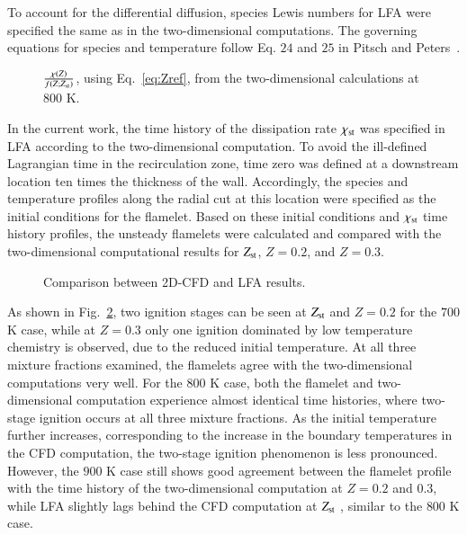 \documentclass[review,3p,times]{elsarticle}
\begin{document}
To account for the differential diffusion, species Lewis numbers for LFA  were specified the same as in the two-dimensional computations.  The governing equations for species and temperature follow Eq. $24$ and $25$ in Pitsch and Peters~\cite{pitsch98b}.

\begin{figure}
  \centering
  \scriptsize
  
  \normalsize
  \caption{$\frac{\chi(Z)}{f(Z;Z_{\rm st})}$, using Eq.~\ref{eq:Zref}, from the two-dimensional calculations at $800$ K.}
  \label{fig:Zref}
\end{figure}

In the current work, the time history of the dissipation rate $\chi_{\rm st}$ was specified in LFA according to the two-dimensional computation.  To avoid the ill-defined Lagrangian time in the recirculation zone, time zero was defined at a downstream location ten times the thickness of the wall.  Accordingly, the species and temperature profiles along the radial cut at this location were specified as the initial conditions for the flamelet.  Based on these initial conditions and $\chi_{\rm st}$ time history profiles, the unsteady flamelets were calculated and compared with the two-dimensional computational results for $Z_{\rm st}$, $Z = 0.2$, and $Z = 0.3$.       

\begin{figure}
  \centering
  \scriptsize
  
  \normalsize
  \caption{Comparison between 2D-CFD and LFA results.}
  \label{fig:LFA}
\end{figure}

As shown in Fig.~\ref{fig:LFA}, two ignition stages can be seen at $Z_{\rm st}$ and $Z = 0.2$ for the $700$ K case, while at $Z = 0.3$ only one ignition dominated by low temperature chemistry is observed, due to the reduced initial temperature.   \textcolor{mycolor}{At all three mixture fractions examined, the flamelets agree with the two-dimensional computations very well.}  For the $800$ K case, both the flamelet and two-dimensional computation experience almost identical time histories, where two-stage ignition occurs at all three mixture fractions.  As the initial temperature further increases, corresponding to the increase in the boundary temperatures in the CFD computation, the two-stage ignition phenomenon is less pronounced.  However, the $900$ K case still shows good agreement between the flamelet profile with the time history of the two-dimensional computation \textcolor{mycolor}{at $Z = 0.2$ and $0.3$, while LFA slightly lags behind the CFD computation at $Z_{\rm st}$ , similar to the $800$ K case.}
  
\end{document}
